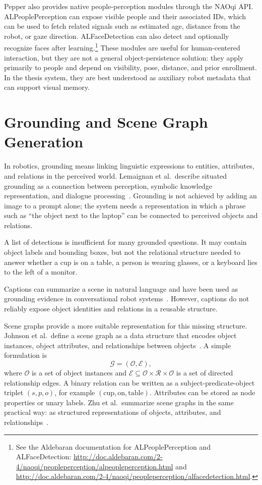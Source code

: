 Pepper also provides native people-perception modules through the NAOqi API. ALPeoplePerception can expose visible people and their associated IDs, which can be used to fetch related signals such as estimated age, distance from the robot, or gaze direction. ALFaceDetection can also detect and optionally recognize faces after learning.\footnote{See the Aldebaran documentation for ALPeoplePerception and ALFaceDetection: \url{http://doc.aldebaran.com/2-4/naoqi/peopleperception/alpeopleperception.html} and \url{http://doc.aldebaran.com/2-4/naoqi/peopleperception/alfacedetection.html}.} These modules are useful for human-centered interaction, but they are not a general object-persistence solution: they apply primarily to people and depend on visibility, pose, distance, and prior enrollment. In the thesis system, they are best understood as auxiliary robot metadata that can support visual memory.


\section{Grounding and Scene Graph Generation}\label{sec:grounding-sgg}


In robotics, grounding means linking linguistic expressions to entities, attributes, and relations in the perceived world. Lemaignan et al.\ describe situated grounding as a connection between perception, symbolic knowledge representation, and dialogue processing~\cite[181--182]{lemaignan_grounding_2012}. Grounding is not achieved by adding an image to a prompt alone; the system needs a representation in which a phrase such as \enquote{the object next to the laptop} can be connected to perceived objects and relations.

A list of detections is insufficient for many grounded questions. It may contain object labels and bounding boxes, but not the relational structure needed to answer whether a cup is on a table, a person is wearing glasses, or a keyboard lies to the left of a monitor.

Captions can summarize a scene in natural language and have been used as grounding evidence in conversational robot systems~\cite{grassi_grounding_2024}. However, captions do not reliably expose object identities and relations in a reusable structure.

Scene graphs provide a more suitable representation for this missing structure. Johnson et al.\ define a scene graph as a data structure that encodes object instances, object attributes, and relationships between objects~\cite[3668--3669]{johnson_image_2015}. A simple formulation is
\[
\mathcal{G}=(\mathcal{O},\mathcal{E}),
\]
where \(\mathcal{O}\) is a set of object instances and \(\mathcal{E}\subseteq \mathcal{O}\times\mathcal{R}\times\mathcal{O}\) is a set of directed relationship edges. A binary relation can be written as a subject-predicate-object triplet \((s,p,o)\), for example \((\text{cup},\text{on},\text{table})\). Attributes can be stored as node properties or unary labels. Zhu et al.\ summarize scene graphs in the same practical way: as structured representations of objects, attributes, and relationships~\cite[3]{zhu_scene_2022}.

